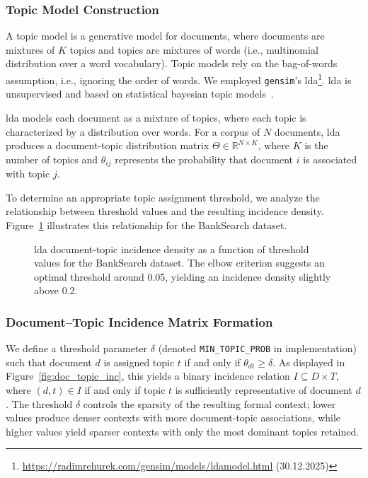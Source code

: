 

\subsubsection{Topic Model Construction}
A topic model is a generative model for documents, where documents are mixtures of $K$ topics and topics are mixtures of words (i.e., multinomial distribution over a word vocabulary).
Topic models rely on the bag-of-words assumption, i.e., ignoring the order of words.
We employed \texttt{gensim}'s \ac{lda}\footnote{\url{https://radimrehurek.com/gensim/models/ldamodel.html} (30.12.2025)}.
\ac{lda} is unsupervised and based on statistical bayesian topic models~\cite{alghamdi_survey_2015}.

\ac{lda} models each document as a mixture of topics, where each topic is characterized by a distribution over words. 
For a corpus of $N$ documents, \ac{lda} produces a document-topic distribution matrix $\Theta \in \mathbb{R}^{N \times K}$, where $K$ is the number of topics and $\theta_{ij}$ represents the probability that document $i$ is associated with topic $j$.

To determine an appropriate topic assignment threshold, we analyze the relationship between threshold values and the resulting incidence density. 
Figure~\ref{fig:incidence_density} illustrates this relationship for the BankSearch dataset.

\begin{figure}[htbp]
    \centering
    
    \caption{\ac{lda} document-topic incidence density as a function of threshold values for the BankSearch dataset. The elbow criterion suggests an optimal threshold around 0.05, yielding an incidence density slightly above 0.2.}
    \label{fig:incidence_density}
\end{figure}

\subsubsection{Document–Topic Incidence Matrix Formation}
\docTopicInc{}

We define a threshold parameter $\delta$ (denoted \texttt{MIN\_TOPIC\_PROB} in implementation) such that document $d$ is assigned topic $t$ if and only if $\theta_{dt} \geq \delta$. 
As displayed in Figure~\ref{fig:doc_topic_inc}, this yields a binary incidence relation $I \subseteq D \times T$, where $(d,t) \in I$ if and only if topic $t$ is sufficiently representative of document $d$. 
The threshold $\delta$ controls the sparsity of the resulting formal context; lower values produce denser contexts with more document-topic associations, while higher values yield sparser contexts with only the most dominant topics retained.